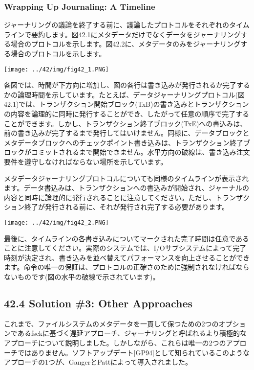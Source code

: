 \hypertarget{wrapping-up-journaling-a-timeline}{%
\subsubsection*{Wrapping Up Journaling: A
Timeline}\label{wrapping-up-journaling-a-timeline}}

ジャーナリングの議論を終了する前に、議論したプロトコルをそれぞれのタイムラインで要約します。図42.1にメタデータだけでなくデータをジャーナリングする場合のプロトコルを示します。図42.2に、メタデータのみをジャーナリングする場合のプロトコルを示します。

\texttt{[image: ../42/img/fig42\_1.PNG]}

各図では、時間が下方向に増加し、図の各行は書き込みが発行されるか完了するかの論理時間を示しています。たとえば、データジャーナリングプロトコル(図42.1)では、トランザクション開始ブロック(TxB)の書き込みとトランザクションの内容を論理的に同時に発行することができ、したがって任意の順序で完了することができます。しかし、トランザクション終了ブロック(TxE)への書込みは、前の書き込みが完了するまで発行してはいけません。同様に、データブロックとメタデータブロックへのチェックポイント書き込みは、トランザクション終了ブロックがコミットされるまで開始できません。水平方向の破線は、書き込み注文要件を遵守しなければならない場所を示しています。

メタデータジャーナリングプロトコルについても同様のタイムラインが表示されます。データ書込みは、トランザクションへの書込みが開始され、ジャーナルの内容と同時に論理的に発行されることに注意してください。ただし、トランザクション終了が発行される前に、それが発行され完了する必要があります。

\texttt{[image: ../42/img/fig42\_2.PNG]}

最後に、タイムラインの各書き込みについてマークされた完了時間は任意であることに注意してください。実際のシステムでは、I/Oサブシステムによって完了時刻が決定され、書き込みを並べ替えてパフォーマンスを向上させることができます。命令の唯一の保証は、プロトコルの正確さのために強制されなければならないものです(図の水平の破線で示されています)。

\hypertarget{solution-3-other-approaches}{%
\subsection*{42.4 Solution \#3: Other
Approaches}\label{solution-3-other-approaches}}

これまで、ファイルシステムのメタデータを一貫して保つための2つのオプションであるfsckに基づく遅延アプローチ、ジャーナリングと呼ばれるより積極的なアプローチについて説明しました。しかしながら、これらは唯一の2つのアプローチではありません。ソフトアップデート{[}GP94{]}として知られているこのようなアプローチの1つが、GangerとPattによって導入されました。


